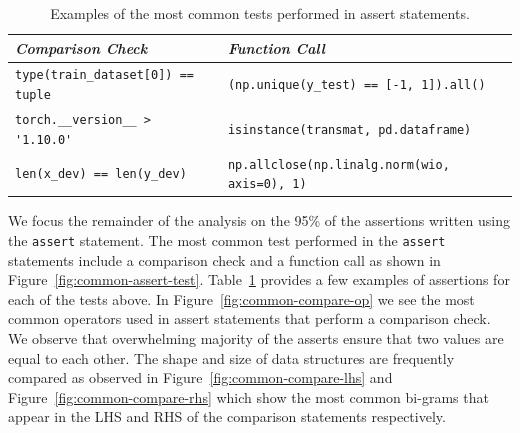 \begin{table}
  \centering
  \caption{Examples of the most common tests performed in assert statements.}
  \begin{tabular}{@{}m{} m{}@{}}
    \toprule
    \emph{\textbf{Comparison Check}}&
    \emph{\textbf{Function Call}}\\
    \midrule

    \lstinline[]$type(train_dataset[0]) == tuple$&
    \lstinline[]$(np.unique(y_test) == [-1, 1]).all()$\\

    \lstinline[]$torch.__version__ > '1.10.0'$&
    \lstinline[]$isinstance(transmat, pd.dataframe)$\\

    \lstinline[]$len(x_dev) == len(y_dev)$&
    \lstinline[]$np.allclose(np.linalg.norm(wio, axis=0), 1)$\\
    \bottomrule
  \end{tabular}
  \label{tab:common-assert-test}
\end{table}

We focus the remainder of the analysis on the 95\% of the assertions written using the \lstinline{assert} statement. The most common test performed in the \lstinline{assert} statements include a comparison check and a function call as shown in Figure~\ref{fig:common-assert-test}. Table~\ref{tab:common-assert-test} provides a few examples of assertions for each of the tests above. In Figure~\ref{fig:common-compare-op} we see the most common operators used in assert statements that perform a comparison check. We observe that overwhelming majority of the asserts ensure that two values are equal to each other. The shape and size of data structures are frequently compared as observed in Figure~\ref{fig:common-compare-lhs} and Figure~\ref{fig:common-compare-rhs} which show the most common bi-grams that appear in the LHS and RHS of the comparison statements respectively.

